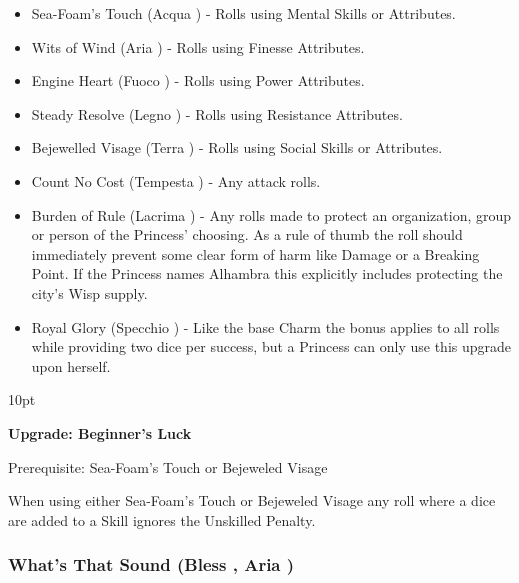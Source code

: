 \begin{itemize}
\item    Sea-Foam's Touch (Acqua \textbullet) - Rolls using Mental Skills or Attributes.

\item    Wits of Wind (Aria \textbullet) - Rolls using Finesse Attributes.

\item    Engine Heart (Fuoco \textbullet) - Rolls using  Power Attributes.

\item    Steady Resolve (Legno \textbullet) - Rolls using  Resistance Attributes.

\item    Bejewelled Visage (Terra \textbullet) - Rolls using Social Skills or Attributes.

\item    Count No Cost (Tempesta \textbullet) - Any attack rolls.

\item    Burden of Rule (Lacrima \textbullet) - Any rolls made to protect an organization, group or person of the Princess' choosing. As a rule of thumb the roll should immediately prevent some clear form of harm like Damage or a Breaking Point. If the Princess names Alhambra this explicitly includes protecting the city's Wisp supply.

\item    Royal Glory (Specchio \textbullet) - Like the base Charm the bonus applies to all rolls while providing two dice per success, but a Princess can only use this upgrade upon herself. 

 \end{itemize}
 
 \begin{myindentpar}{10pt}
 
 \textbf{Upgrade: Beginner's Luck}
 
 Prerequisite: Sea-Foam's Touch or Bejeweled Visage
 
 When using either Sea-Foam's Touch or Bejeweled Visage any roll where a dice are added to a Skill ignores the Unskilled Penalty. 
 
 \end{myindentpar}
  
\subsubsection*{What's That Sound (Bless \textbullet, Aria \textbullet)}

